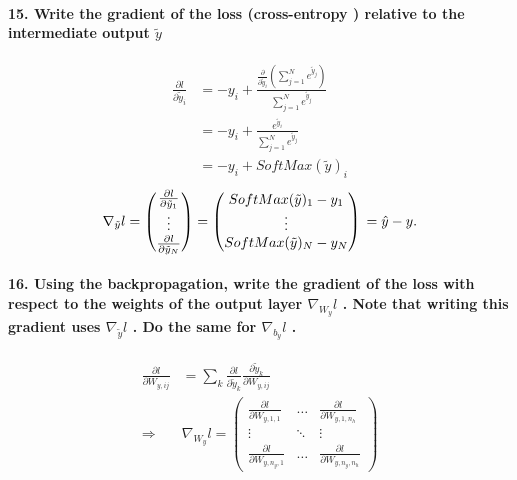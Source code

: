 \documentclass{article}
\theoremstyle{plain}%
\theoremstyle{definition}
\theoremstyle{remark}
\begin{document}
\paragraph{15. Write the gradient of the loss (cross-entropy ) relative to the intermediate output $ \tilde{y} $ }
\begin{align*}
    \frac{\partial l}{\partial \tilde{y}_i} &= -y_i + \frac{\frac{\partial }{\partial \tilde{y}_i } (\sum_{j=1}^{N} e^{ \tilde{y}_j })}{\sum_{j=1}^{N} e^{ \tilde{y}_j }} \\
        &= - y_i + \frac{e^{\tilde{y}_i}}{\sum_{j=1}^{N} e^{ \tilde{y}_j}} \\
        &= - y_i + SoftMax(\tilde{y})_i
\end{align*}
\[
    \nabla _{\tilde{y}}l = \begin{pmatrix}
        \frac{\partial l}{\partial \tilde{y}_1} \\
        \vdots \\
        \frac{\partial l}{\partial \tilde{y}_N}
    \end{pmatrix} = \begin{pmatrix}
        SoftMax(\tilde{y})_1 - y_1 \\
        \vdots \\
        SoftMax(\tilde{y})_N - y_N
    \end{pmatrix} \\
    = \hat{y} - y
.\]


\paragraph{16. Using the backpropagation, write the gradient of the loss with respect to the weights of the output layer $ \nabla _{W_y}l $ . Note that writing this gradient uses $ \nabla _{\tilde{y}}l $ . Do the same for $ \nabla _{b_y}l $ .}
\begin{align*}
    \frac{\partial l}{\partial W_{y,ij}} &= \sum_{k}^{} \frac{\partial l}{\partial \tilde{y}_k} \frac{\partial \tilde{y}_k}{\partial W_{y,ij}} \\
    \Rightarrow & \nabla_{W_y} l = \begin{pmatrix}
        \frac{\partial l}{\partial W_{y, 1,1}} & \dots & \frac{\partial l}{\partial W_{y, 1,n_h}}\\
        \vdots & \ddots & \vdots \\
        \frac{\partial l}{\partial W_{y, n_y,1}} & \dots & \frac{\partial l}{\partial W_{y, n_y, n_h}}
    \end{pmatrix}
\end{align*}
\end{document}
